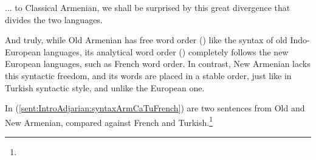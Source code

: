... to Classical Armenian, we shall be surprised by this great divergence that divides the two languages. 

And truly, while Old Armenian has free word order () like the syntax of old Indo-European languages, its analytical word order () completely follows the new European languages, such as French word order. In contrast, New Armenian lacks this syntactic freedom, and its words are placed in a stable order, just like in Turkish syntactic style, and unlike the European one. 



In (\ref{sent:IntroAdjarian:syntaxArmCaTuFrench}) are two sentences from Old and New Armenian, compared against French and Turkish.\footnote{
}

